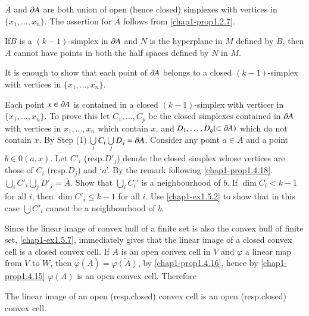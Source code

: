 \begin{step}\label{chap1-step1}
$\overline{A}$ and $\partial A$ are both union of open (hence closed) simplexes with vertices in $\{x_{1},\ldots,x_{n}\}$. The assertion for $\overline{A}$ follows from \ref{chap1-prop1.2.7}.
\end{step}

\begin{step}%
If\pageoriginale $B$ is a $(k-1)$-simplex in $\partial A$ and $N$ is the hyperplane in $M$ defined by $B$, then $A$ cannot have points in both the half spaces defined by $N$ in $M$.
\end{step}

\begin{step}%
It is enough to show that each point of $\partial A$ belongs to a closed $(k-1)$-simplex with vertices in $\{x_{1},\ldots,x_{n}\}$.
\end{step}

\begin{step}%
Each point $x\in \partial A$ is contained in a closed $(k-1)$-simplex with verticer in $\{x_{1},\ldots,x_{n}\}$. To prove this let $C_{1},\ldots,C_{p}$ be the closed simplexes contained in $\partial A$ with vertices in $x_{1},\ldots,x_{n}$ which contain $x$, and $D_{1},\ldots,D_{q}(\subset\partial A)$ which do not contain $x$. By Step (1) $\bigcup\limits_{i}C_{i}\bigcup\limits_{j}D_{j}=\partial A$. Consider any point $a\in A$ and a point $b\in 0(a,x)$. Let $C'_{i}$ (resp.\@ $D'_{j}$) denote the closed simplex whose vertices are those of $C_{i}$ (resp.\@ $D_{j}$) and `$a$'. By the remark following \ref{chap1-prop1.4.18}. $\bigcup\limits_{i}C'_{i}\bigcup\limits_{j}D'_{j}=\overline{A}$. Show that $\bigcup\limits_{i}C_{i}'$ is a neighbourhood of $b$. If $\dim C_{i}<k-1$ for all $i$, then $\dim C'_{i}\leq k-1$ for all $i$. Use \ref{chap1-ex1.5.2} to show that in this case $\bigcup C'_{i}$ cannot be a neighbourhood of $b$.
\end{step}

Since the linear image of convex hull of a finite set is also the convex hull of finite set, \ref{chap1-ex1.5.7}, immediately gives that the linear image of a closed convex cell is a closed convex cell. If $A$ is an open convex cell in $V$ and $\varphi$ a linear map from $V$ to $W$, then $\varphi(\overline{A})=\overline{\varphi(A)}$, by \ref{chap1-prop1.4.16}, hence by \ref{chap1-prop1.4.15} $\varphi(A)$ is an open convex cell. Therefore

\begin{proposition}\label{chap1-prop1.5.8}
The linear image of an open (resp.\@ closed) convex cell is an open (resp.\@ closed) convex cell.
\end{proposition}


